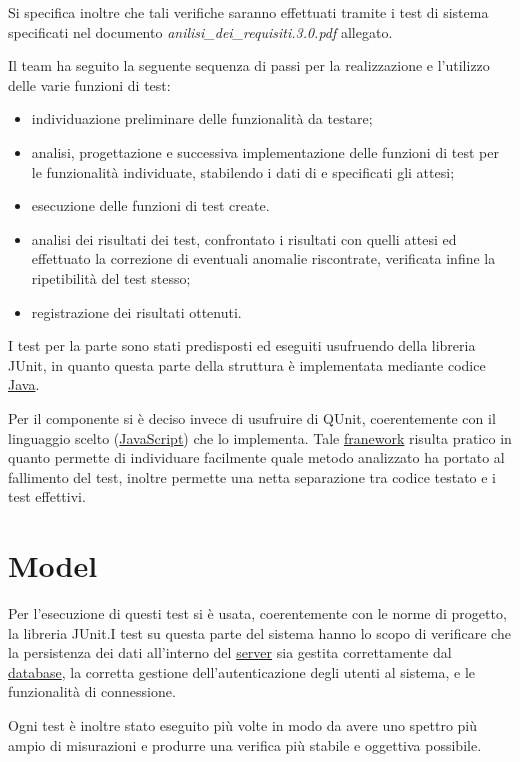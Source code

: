 Si specifica inoltre che tali verifiche saranno effettuati tramite i test di sistema specificati nel documento \textit{anilisi\_dei\_requisiti.3.0.pdf} allegato.
\clearpage

Il team ha seguito la seguente sequenza di passi per la realizzazione e l'utilizzo delle varie funzioni di test:
\begin{itemize}[noitemsep,nolistsep]
\item individuazione preliminare delle funzionalità da testare;
\item analisi, progettazione e successiva implementazione delle funzioni di test per le funzionalità individuate, stabilendo i dati di  e specificati gli  attesi;
\item esecuzione delle funzioni di test create.
\item analisi dei risultati dei test, confrontato i risultati con quelli attesi ed effettuato la correzione di eventuali anomalie riscontrate, verificata infine la ripetibilità del test stesso;
\item registrazione dei risultati ottenuti.
\end{itemize}

I test per la parte  sono stati predisposti ed eseguiti usufruendo della libreria JUnit, in quanto questa parte della struttura è implementata mediante codice \underline{Java}.

Per il componente  si è deciso invece di usufruire di QUnit, coerentemente con il linguaggio scelto (\underline{JavaScript}) che lo implementa. Tale \underline{franework} risulta pratico in quanto permette di individuare facilmente quale metodo analizzato ha portato al fallimento del test, inoltre permette una netta separazione tra codice testato e i test effettivi.

\section{Model}
Per l'esecuzione di questi test si è usata, coerentemente con le norme di progetto, la libreria JUnit.I test su questa parte del sistema hanno lo scopo di verificare che la persistenza dei dati all'interno del \underline{server} sia gestita correttamente dal \underline{database}, la corretta gestione dell'autenticazione degli utenti al sistema, e le funzionalità di connessione.

Ogni test è inoltre stato eseguito più volte in modo da avere uno spettro più ampio di misurazioni e produrre una verifica più stabile e oggettiva possibile.

